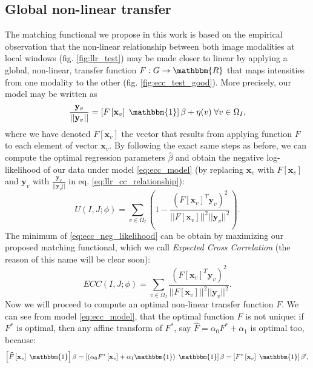 \subsection{Global non-linear transfer}
The matching functional we propose in this work is based on the empirical observation that the non-linear relationship between both image modalities at local windows (fig. \ref{fig:llr_test}) may be made closer to linear by applying a global, non-linear, transfer function $F: G \rightarrow \mathbbm{R}$ that maps intensities from one modality to the other (fig. \ref{fig:ecc_test_good}). More precisely, our model may be written as
\begin{equation}\label{eq:ecc_model}
    \frac{\mathbf{y}_{v}}{||\mathbf{y}_{v}||} = \left[F\left[\mathbf{x}_{v}\right] \; \mathbbm{1}\right]\beta + \eta(v) \; \forall v\in\Omega_{I},
\end{equation}
where we have denoted $F[\mathbf{x}_{v}]$ the vector that results from applying function $F$ to each element of vector $\mathbf{x}_{v}$. By following the exact same steps as before, we can compute the optimal regression parameters $\widehat{\beta}$ and obtain the negative log-likelihood of our data under model \eqref{eq:ecc_model} (by replacing $\mathbf{x}_{v}$ with $F[\mathbf{x}_{v}]$ and $\mathbf{y}_{v}$ with $\frac{\mathbf{y}_{v}}{||\mathbf{y}_{v}||}$ in eq. \eqref{eq:llr_cc_relationship}):
\begin{equation}\label{eq:ecc_neg_likelihood}
    U(I, J;\phi) = \sum_{v\in\Omega_{I}}\left(1-\frac{\left(F\left[\mathbf{x}_{v}\right]^{T} \mathbf{y}_{v}\right)^{2}}{||F\left[\mathbf{x}_{v}\right]||^{2}||\mathbf{y}_{v}||^{2}}\right).
\end{equation}
The minimum of \eqref{eq:ecc_neg_likelihood} can be obtain by maximizing our proposed matching functional, which we call \emph{Expected Cross Correlation} (the reason of this name will be clear soon):
\begin{equation}\label{eq:ecc_functional}
    ECC(I, J;\phi) = \sum_{v\in\Omega_{I}}\frac{\left(F\left[\mathbf{x}_{v}\right]^{T} \mathbf{y}_{v}\right)^{2}}{||F\left[\mathbf{x}_{v}\right]||^{2}||\mathbf{y}_{v}||^{2}}.
\end{equation}
Now we will proceed to compute an optimal non-linear transfer function $F$. We can see from model \eqref{eq:ecc_model}, that the optimal function $F$ is not unique: if $F^{*}$ is optimal, then any affine transform of $F^{*}$, say $\widehat{F} = \alpha_{0} F^{*} + \alpha_{1}$ is optimal too, because:
\begin{displaymath}
    \left[\widehat{F}\left[\mathbf{x}_{v}\right] \; \mathbbm{1}\right]\beta =
    \left[\left(\alpha_{0}F^{*}\left[\mathbf{x}_{v}\right]+\alpha_{1}\mathbbm{1}\right) \; \mathbbm{1}\right]\beta =
    \left[F^{*}\left[\mathbf{x}_{v}\right] \; \mathbbm{1}\right]\beta',
\end{displaymath}
